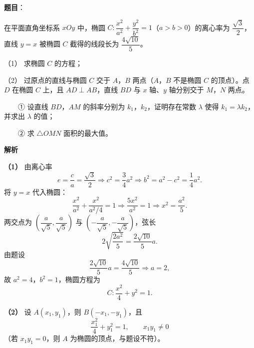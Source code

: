 \begin{answer}

\textbf{题目}：

在平面直角坐标系 $xOy$ 中，椭圆 $C:\dfrac{x^2}{a^2}+\dfrac{y^2}{b^2}=1$（$a>b>0$）的离心率为 $\dfrac{\sqrt3}2$，直线 $y=x$ 被椭圆 $C$ 截得的线段长为 $\dfrac{4\sqrt{10}}5$。

（1） 求椭圆 $C$ 的方程；

（2） 过原点的直线与椭圆 $C$ 交于 $A$，$B$ 两点（$A$，$B$ 不是椭圆 $C$ 的顶点）。点 $D$ 在椭圆 $C$ 上，且 $AD\perp AB$，直线 $BD$ 与 $x$ 轴、$y$ 轴分别交于 $M$，$N$ 两点。

　　① 设直线 $BD$，$AM$ 的斜率分别为 $k_1$，$k_2$，证明存在常数 $\lambda$ 使得 $k_1=\lambda k_2$，并求出 $\lambda$ 的值；

　　② 求 $\triangle OMN$ 面积的最大值。

\textbf{解析}

\textbf{（1）} 由离心率
\nopagebreak[4]
\[e=\frac ca=\frac{\sqrt3}2\Longrightarrow c^2=\frac34a^2
\Longrightarrow b^2=a^2-c^2=\frac14a^2 .\]
将 $y=x$ 代入椭圆：
\nopagebreak[4]
\[\frac{x^2}{a^2}+\frac{x^2}{a^2/4}=1
\Longrightarrow\frac{5x^2}{a^2}=1
\Longrightarrow x^2=\frac{a^2}5 .\]
两交点为 $\left(\dfrac a{\sqrt5},\dfrac a{\sqrt5}\right)$ 与 $\left(-\dfrac a{\sqrt5},-\dfrac a{\sqrt5}\right)$，弦长
\nopagebreak[4]
\[2\sqrt{\frac{2a^2}5}=\frac{2\sqrt{10}}5a .\]
由题设
\nopagebreak[4]
\[\frac{2\sqrt{10}}5a=\frac{4\sqrt{10}}5\Longrightarrow a=2,\]
故 $a^2=4$，$b^2=1$，椭圆方程为
\nopagebreak[4]
\[C:\frac{x^2}4+y^2=1 .\]

\textbf{（2）} 设 $A(x_1,y_1)$，则 $B(-x_1,-y_1)$，且
\nopagebreak[4]
\[\frac{x_1^2}4+y_1^2=1,\qquad x_1y_1\neq0\]
（若 $x_1y_1=0$，则 $A$ 为椭圆的顶点，与题设不符）。


\end{answer}
